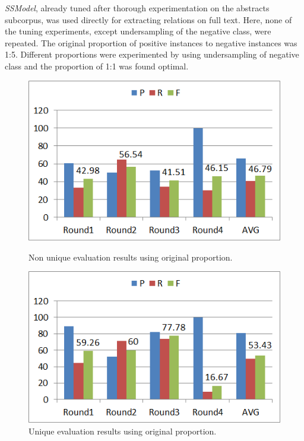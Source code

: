 \textit{SSModel}, already tuned after thorough experimentation on the abstracts subcorpus, was used directly for extracting relations on full text. Here, none of the tuning experiments, except undersampling \cite{akbani2004applying} of the negative class, were repeated. The original proportion of positive instances to negative instances was 1:5. Different proportions were experimented by using undersampling of negative class and the proportion of 1:1 was found optimal.

\begin{figure}
\centering
\begin{minipage}{.5\textwidth}
  \centering
  \includegraphics[width=.95\textwidth]{figures/3_FTOrigRatioResults.png}
  \caption{Non unique evaluation results using original proportion.}
  \label{fig:FT_ResOrigNonUniq}
\end{minipage}%
\begin{minipage}{.5\textwidth}
  \centering
  \includegraphics[width=.95\textwidth]{figures/3_FTOrigRatioResults_Uniq.png}
  \caption{Unique evaluation results using original proportion.}
  \label{fig:FT_ResOrigUniq}
\end{minipage}
\end{figure}

